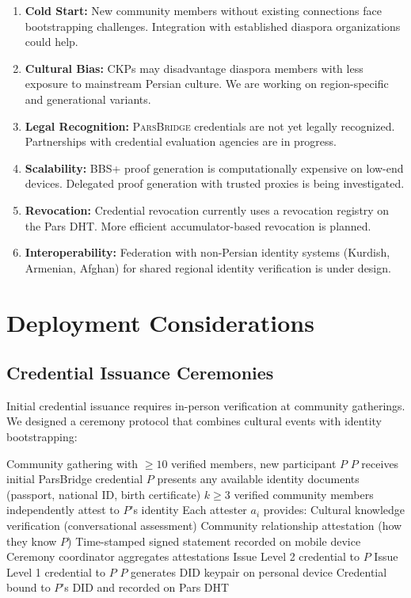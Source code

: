\documentclass[11pt,a4paper]{article}
\newcommand{\bridge}{\textsc{ParsBridge}\xspace}
\begin{document}
\begin{enumerate}
    \item \textbf{Cold Start:} New community members without existing connections face bootstrapping challenges. Integration with established diaspora organizations could help.
    \item \textbf{Cultural Bias:} CKPs may disadvantage diaspora members with less exposure to mainstream Persian culture. We are working on region-specific and generational variants.
    \item \textbf{Legal Recognition:} \bridge credentials are not yet legally recognized. Partnerships with credential evaluation agencies are in progress.
    \item \textbf{Scalability:} BBS+ proof generation is computationally expensive on low-end devices. Delegated proof generation with trusted proxies is being investigated.
    \item \textbf{Revocation:} Credential revocation currently uses a revocation registry on the Pars DHT. More efficient accumulator-based revocation is planned.
    \item \textbf{Interoperability:} Federation with non-Persian identity systems (Kurdish, Armenian, Afghan) for shared regional identity verification is under design.
\end{enumerate}

\section{Deployment Considerations}

\subsection{Credential Issuance Ceremonies}

Initial credential issuance requires in-person verification at community gatherings. We designed a ceremony protocol that combines cultural events with identity bootstrapping:

\begin{algorithm}[H]
\caption{Community Credential Ceremony}
\label{alg:ceremony}
\begin{algorithmic}[1]
\Require Community gathering with $\geq 10$ verified members, new participant $P$
\Ensure $P$ receives initial ParsBridge credential
\State $P$ presents any available identity documents (passport, national ID, birth certificate)
\State $k \geq 3$ verified community members independently attest to $P$'s identity
\State Each attester $a_i$ provides:
\State \quad Cultural knowledge verification (conversational assessment)
\State \quad Community relationship attestation (how they know $P$)
\State \quad Time-stamped signed statement recorded on mobile device
\State Ceremony coordinator aggregates attestations
    \State Issue Level 2 credential to $P$
    \State Issue Level 1 credential to $P$
\EndIf
\State $P$ generates DID keypair on personal device
\State Credential bound to $P$'s DID and recorded on Pars DHT
\end{algorithmic}
\end{algorithm}
\end{document}
